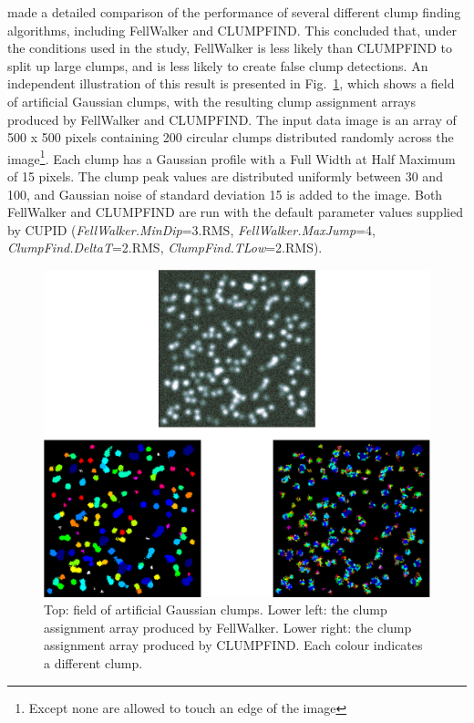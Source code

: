 \documentclass[final,authoryear,5p,times,twocolumn]{elsarticle}
\begin{document}
\cite{2010Watson} made a detailed comparison of the performance of several
different clump finding algorithms, including FellWalker and CLUMPFIND.
This concluded that, under the conditions used in the study, FellWalker
is less likely than CLUMPFIND to split up large clumps, and is less
likely to create false clump detections. An independent illustration of
this result is presented in Fig.~\ref{fig:comp1}, which shows a field of
artificial Gaussian clumps, with the resulting clump assignment arrays
produced by FellWalker and CLUMPFIND. The input data image is an array of
500 x 500 pixels containing 200 circular clumps distributed randomly
across the image\footnote{Except none are allowed to touch an edge of the
image}. Each clump has a Gaussian profile with a Full Width at Half
Maximum of 15 pixels. The clump peak values are distributed uniformly
between 30 and 100, and Gaussian noise of standard deviation 15 is added
to the image. Both FellWalker and CLUMPFIND are run with the default
parameter values supplied by CUPID (\emph{FellWalker.MinDip}=3.RMS,
\emph{FellWalker.MaxJump}=4, \emph{ClumpFind.DeltaT}=2.RMS,
\emph{ClumpFind.TLow}=2.RMS).

\begin{figure}
\includegraphics[width=\columnwidth]{comp1}
\caption{Top: field of artificial Gaussian clumps. Lower left: the clump
assignment array produced by FellWalker. Lower right: the clump assignment
array produced by CLUMPFIND. Each colour indicates a different clump. }
\label{fig:comp1}
\end{figure}
\end{document}
